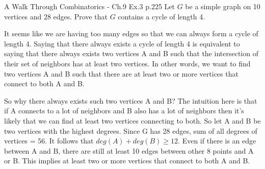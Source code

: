 \begin{problem}{}{}{A Walk Through Combinatorics - Ch.9 Ex.3 p.225}
Let \(G\) be a simple graph on 10 vertices and 28 edges. Prove that \(G\)
contains a cycle of length 4.
\end{problem}

\begin{solution}
    It seems like we are having too many edges so that we can always form
    a cycle of length 4. Saying that there always exists a cycle of length 4 is equivalent to
    saying that there always exists two vertices A and B such that the intersection of their
    set of neighbors has at least two vertices. In other words, we want to find two vertices
    A and B such that there are at least two or more vertices that connect to both A and B.

    So why there always exists such two vertices A and B? The intuition here is that if A connects
    to a lot of neighbors and B also has a lot of neighbors then it's likely that we can find
    at least two vertices connecting to both. So let A and B be two vertices with the highest degrees.
    Since G has 28 edges, sum of all degrees of vertices = 56. It follows that \(deg(A) + deg(B) \ge 12\). 
    Even if there is an edge between A and B, there are still at least 10 edges between other 
    8 points and A or B. This implies at least two or more vertices that connect to both A and B.
\end{solution}